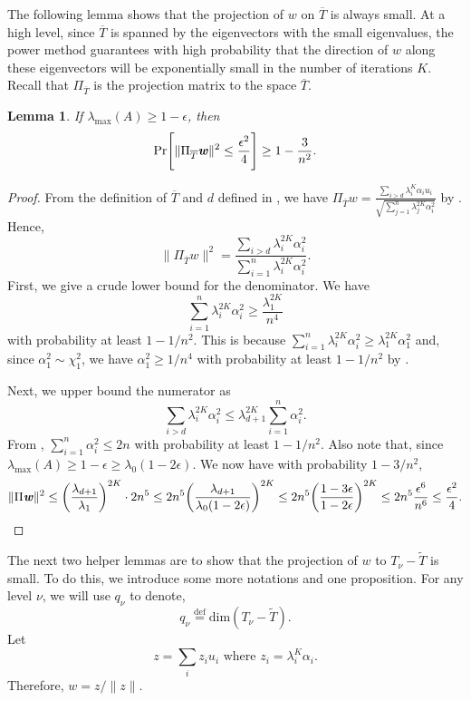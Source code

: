 \documentclass[11pt]{article}
\newcommand{\defeq}{\stackrel{\textup{def}}{=}}
\newtheorem{lemma}[theorem]{Lemma}
\let\originalleft\left
\let\originalright\right
\renewcommand{\left}{\mathopen{}\mathclose\bgroup\originalleft}
\renewcommand{\right}{\aftergroup\egroup\originalright}
\def\defeq{\stackrel{\mathrm{def}}{=}}
\def\dim#1{\mathrm{dim} (#1)}
\newcommand\uu{\boldsymbol{\mathit{u}}}
\newcommand\ww{\boldsymbol{\mathit{w}}}
\newcommand\zz{\boldsymbol{\mathit{z}}}
\renewcommand\AA{\boldsymbol{\mathit{A}}}
\begin{document}
The following lemma shows that the projection of $\ww$ on $\overline{T}$ is always small. At a high level, 
since $\overline{T}$ is spanned by the eigenvectors with the small eigenvalues, the power method guarantees with high probability that the direction of $\ww$ along these eigenvectors will be exponentially small in the number of iterations $K$.
Recall that $\Pi_{\overline{T}}$ is the projection matrix to the space $\overline{T}$.
\begin{lemma}\label{lem:boundLowEV}
If $\lambda_{\max}(\AA)\geq 1-\epsilon$, then
\[
\Pr\left[\|\Pi_{\overline{T}}\ww\|^2 \leq \frac{\epsilon^2}{4}\right]\geq 1 - \frac{3}{n^2}.
\]
\end{lemma}
\begin{proof}
From the definition of $\overline{T}$ and $d$ defined in , we have $\Pi_{\overline{T}}\ww = \frac{\sum_{i>d} \lambda_i^{K}\alpha_i\uu_i}{\sqrt{\sum_{j=1}^n \lambda_j^{2K}\alpha_i^2}}$ by . Hence,  
\[
\|\Pi_{\overline{T}}\ww\|^2 = \frac{\sum_{i>d}\lambda_i^{2K}\alpha_i^2}{\sum_{i=1}^n\lambda_i^{2K}\alpha_i^2}.
\]
First, we give a crude lower bound for the denominator. We have $$\sum_{i=1}^n\lambda_i^{2K}\alpha_i^2 \geq \frac{\lambda_1^{2K}}{n^4}$$ with probability at least $1-1/n^{2}$. This is because $\sum_{i=1}^n\lambda_i^{2K}\alpha_i^2 \geq \lambda_1^{2K}\alpha_1^2$ and,  since $\alpha_1^2 \sim \chi^2_1$,  we have $\alpha_1^2 \geq 1/n^4$ with probability at least $1-1/n^{2}$ by .

Next, we upper bound the numerator as 
\[
\sum_{i>d}\lambda_i^{2K}\alpha_i^2 \leq \lambda_{d+1}^{2K}\sum_{i=1}^n\alpha_i^2.
\]
From , $\sum_{i=1}^n\alpha_i^2 \leq 2 n$ with probability at least $1-1/n^2$. Also note that, since $\lambda_{\max}(\AA)\geq 1-\epsilon \geq \lambda_0 (1-2\epsilon)$. We now have with probability $1-3/n^2$,
\[
\|\Pi\ww\|^2 \leq \left(\frac{\lambda_{d+1}}{\lambda_1}\right)^{2K}\cdot 2n^5 \leq  2n^5\left(\frac{\lambda_{d+1}}{\lambda_0 (1-2\epsilon)}\right)^{2K} \leq 2 n^5 \left(\frac{1-3\epsilon}{1-2\epsilon}\right)^{2K} \leq 2 n^5 \frac{\epsilon^6}{n^6}\leq \frac{\epsilon^2}{4}.\qedhere
\]
\end{proof}


The next two helper lemmas are to show that the projection of $\ww$ to $T_{\nu}- \tilde{T}$ is small. To do this, we introduce some more notations and one proposition. 
For any level $\nu$, we will use $q_{\nu}$ to denote,
\begin{equation}
    q_{\nu} \defeq \dim{T_{\nu}-\tilde{T}}.
\end{equation}
Let 
\begin{equation}\label{def:z}
\zz=\sum_{i}z_{i}\uu_{i}\text{ where }z_{i}=\lambda_{i}^{K}\alpha_{i}.
\end{equation} 
Therefore, $\ww=\zz/\|\zz\|$.
\end{document}
